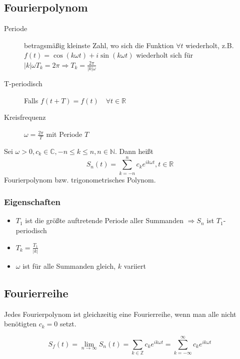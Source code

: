 \begin{sectionbox}
    \subsection{Fourierpolynom}
    \begin{description}
        \item[Periode] betragsmäßig kleinste Zahl, wo sich die Funktion $\forall t$ wiederholt,
              z.B. $f(t)=\cos(k\omega t) + i\sin(k\omega t)$ wiederholt sich für $|k|\omega T_k=2\pi \Rightarrow T_k=\frac{2\pi}{|k|\omega}$
        \item[T-periodisch] Falls $f(t + T)=f(t) \quad \forall t\in\mathbb R$
        \item[Kreisfrequenz] $\omega = \frac{2\pi}{T}$ mit Periode $T$
    \end{description}

    Sei $\omega > 0, c_k \in \mathbb C, -n \le k \le n, n \in \mathbb N$. Dann heißt
    \begin{equation*}
        S_n(t)=\sum_{k=-n}^{n}c_ke^{ik\omega t}, t\in\mathbb R
    \end{equation*}
    Fourierpolynom bzw. trigonometrisches Polynom.

    \subsubsection{Eigenschaften}
    \begin{itemize}
        \item $T_1$ ist die größte auftretende Periode aller Summanden $\Rightarrow S_n$ ist $T_1$-periodisch
        \item $T_k= \frac{T_1}{|k|}$
        \item $\omega$ ist für alle Summanden gleich, $k$ variiert
    \end{itemize}
\end{sectionbox}

\subsection{Fourierreihe}
Jedes Fourierpolynom ist gleichzeitig eine Fourierreihe, wenn man alle nicht benötigten $c_k=0$ setzt.
\begin{emphbox}
    \begin{equation*}
        S_f(t)=\lim_{n\rightarrow\infty}S_n(t)=\sum_{k\in\mathbb Z}c_ke^{ik\omega t}=\sum_{k=-\infty}^{\infty}c_ke^{ik\omega t}
    \end{equation*}
\end{emphbox}

